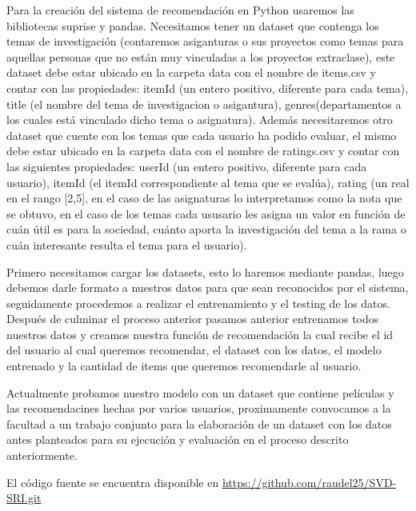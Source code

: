 \documentclass{article}
\begin{document}
Para la creación del sistema de recomendación en Python usaremos las bibliotecas suprise y pandas.
Necesitamos tener un dataset que contenga los temas de investigación (contaremos asiganturas o sus proyectos como temas para aquellas personas que no están muy vinculadas a los proyectos extraclase), este dataset debe estar ubicado en la carpeta data con el nombre de items.csv y contar con las propiedades: itemId (un entero positivo, diferente para cada tema), title (el nombre del tema de investigacion o asigantura), genres(departamentos a los cuales está vinculado dicho tema o asignatura).
Además necesitaremos otro dataset que cuente con los temas que cada usuario ha podido evaluar, el mismo debe estar ubicado en la carpeta data con el nombre de ratings.csv y contar con las siguientes propiedades: userId (un entero positivo, diferente para cada usuario), itemId (el itemId correspondiente al tema que se evalúa), rating (un real en el rango [2,5], en el caso de las asignaturas lo interpretamos como la nota que se obtuvo, en el caso de los temas cada ususario les asigna un valor en función de cuán útil es para la sociedad, cuánto aporta la investigación del tema a la rama o cuán interesante resulta el tema para el usuario).

Primero necesitamos cargar los datasets, esto lo haremos mediante pandas, luego debemos darle formato a nuestros datos para que sean reconocidos por el sistema, seguidamente procedemos a realizar el entrenamiento y el testing de los datos. Después de culminar el proceso anterior pasamos anterior entrenamos todos nuestros datos y creamos nuestra función de recomendación la cual recibe el id del usuario al cual queremos recomendar, el dataset con los datos, el modelo entrenado y la cantidad de items que queremos recomendarle al usuario.

Actualmente probamos nuestro modelo con un dataset que contiene películas y las recomendacines hechas por varios usuarios, proximamente convocamos a la facultad a un trabajo conjunto para la elaboración de un dataset con los datos antes planteados para su ejecución y evaluación en el proceso descrito anteriormente.

El código fuente se encuentra disponible en \url{https://github.com/raudel25/SVD-SRI.git}
\end{document}
